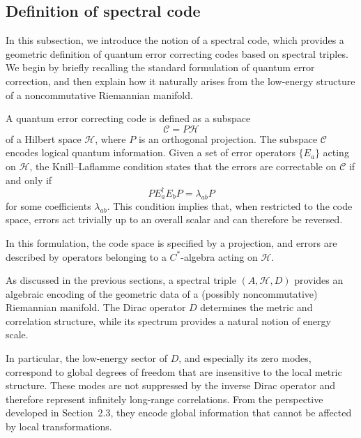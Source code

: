 \documentclass[12pt]{article}
\theoremstyle{definition} %
\theoremstyle{plain} %
\theoremstyle{remark} %
\theoremstyle{underline}
\begin{document}
\subsection{Definition of spectral code}

In this subsection, we introduce the notion of a spectral code, which provides a geometric definition of quantum error correcting codes based on spectral triples. We begin by briefly recalling the standard formulation of quantum error correction, and then explain how it naturally arises from the low-energy structure of a noncommutative Riemannian manifold.

A quantum error correcting code \cite{beny2007generalization,beny2007quantum} is defined as a subspace
\[
    \mathcal{C} = P\mathcal{H}
\]
of a Hilbert space $\mathcal{H}$, where $P$ is an orthogonal projection. The subspace $\mathcal{C}$ encodes logical quantum information. Given a set of error operators $\{E_a\}$ acting on $\mathcal{H}$, the Knill--Laflamme condition \cite{knill1996theory} states that the errors are correctable on $\mathcal{C}$ if and only if
\[
    P E_a^\dagger E_b P = \lambda_{ab} P
\]
for some coefficients $\lambda_{ab}$. This condition implies that, when restricted to the code space, errors act trivially up to an overall scalar and can therefore be reversed.

In this formulation, the code space is specified by a projection, and errors are described by operators belonging to a $C^*$-algebra acting on $\mathcal{H}$.

As discussed in the previous sections, a spectral triple $(A,\mathcal{H},D)$ provides an algebraic encoding of the geometric data of a (possibly noncommutative) Riemannian manifold. The Dirac operator $D$ determines the metric and correlation structure, while its spectrum provides a natural notion of energy scale.

In particular, the low-energy sector of $D$, and especially its zero modes, correspond to global degrees of freedom that are insensitive to the local metric structure. These modes are not suppressed by the inverse Dirac operator and therefore represent infinitely long-range correlations. From the perspective developed in Section~2.3, they encode global information that cannot be affected by local transformations.
\end{document}
